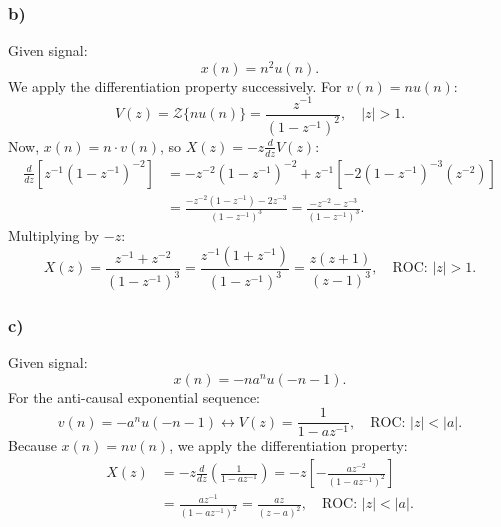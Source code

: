\documentclass[12pt,a4paper]{article}
\begin{document}
\subsubsection*{b)}
Given signal:
\begin{equation}
    x(n) = n^2 u(n).
\end{equation}
We apply the differentiation property successively. For $v(n) = n u(n)$:
\begin{equation}
    V(z) = \mathcal{Z}\{n u(n)\} = \frac{z^{-1}}{(1 - z^{-1})^2}, \quad |z| > 1.
\end{equation}
Now, $x(n) = n \cdot v(n)$, so $X(z) = -z \frac{d}{dz} V(z)$:
\begin{align*}
    \frac{d}{dz} \left[ z^{-1}(1 - z^{-1})^{-2} \right] &= -z^{-2}(1 - z^{-1})^{-2} + z^{-1}\left[ -2(1 - z^{-1})^{-3}(z^{-2}) \right] \\
    &= \frac{-z^{-2}(1 - z^{-1}) - 2z^{-3}}{(1 - z^{-1})^3} = \frac{-z^{-2} - z^{-3}}{(1 - z^{-1})^3}.
\end{align*}
Multiplying by $-z$:
\begin{equation}
    X(z) = \frac{z^{-1} + z^{-2}}{(1 - z^{-1})^3} = \frac{z^{-1}(1 + z^{-1})}{(1 - z^{-1})^3} = \frac{z(z + 1)}{(z - 1)^3}, \quad \text{ROC: } |z| > 1.
\end{equation}

\subsubsection*{c)}
Given signal:
\begin{equation}
    x(n) = -n a^n u(-n-1).
\end{equation}
For the anti-causal exponential sequence:
\begin{equation}
    v(n) = -a^n u(-n-1) \longleftrightarrow V(z) = \frac{1}{1 - a z^{-1}}, \quad \text{ROC: } |z| < |a|.
\end{equation}
Because $x(n) = n v(n)$, we apply the differentiation property:
\begin{align}
    X(z) &= -z \frac{d}{dz}\left( \frac{1}{1 - a z^{-1}} \right) = -z \left[ -\frac{a z^{-2}}{(1 - a z^{-1})^2} \right] \nonumber \\
         &= \frac{a z^{-1}}{(1 - a z^{-1})^2} = \frac{a z}{(z - a)^2}, \quad \text{ROC: } |z| < |a|.
\end{align}
\end{document}
